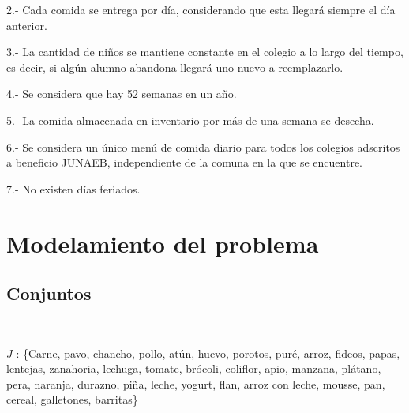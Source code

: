 \documentclass[letterpaper]{article}
\begin{document}
\vspace{0.3cm}
2.- Cada comida se entrega por día, considerando que esta llegará siempre el día anterior.

\vspace{0.3cm}
3.- La cantidad de niños se mantiene constante en el colegio a lo largo del tiempo, es decir, si algún alumno abandona llegará uno nuevo a reemplazarlo.

\vspace{0.3cm}
4.- Se considera que hay 52 semanas en un año.

\vspace{0.3cm}
5.- La comida almacenada en inventario por más de una semana se desecha.

\vspace{0.3cm}
6.- Se considera un único menú de comida diario para todos los colegios adscritos a beneficio JUNAEB, independiente de la comuna en la que se encuentre.

\vspace{0.3cm}
7.- No existen días feriados.

\section{Modelamiento del problema}
    \subsection{Conjuntos}
    
    \\
    

    \begin{minipage}{1.1\linewidth}
    \setlength{\parindent}{0em} 
    $J$ : \{Carne, pavo, chancho, pollo, atún, huevo, porotos, puré, arroz, fideos, papas, lentejas, zanahoria, lechuga, tomate, brócoli, coliflor, apio, manzana, plátano, pera, naranja, durazno, piña, leche, yogurt, flan, arroz con leche, mousse, pan, cereal, galletones, barritas\}     
\end{minipage}
\\

    \\
    
    \\

    \\
    
\end{document}
